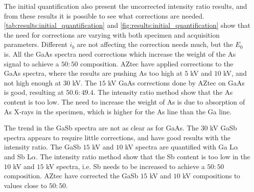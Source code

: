 




The initial quantification also present the uncorrected intensity ratio results, and from these results it is possible to see what corrections are needed.
\cref{tab:results:initial_quantification} and \cref{fig:results:initial_quantification} show that the need for corrections are varying with both specimen and acquisition parameters.
Different $i_b$ are not affecting the correction needs much, but the $E_0$ is.
All the GaAs spectra need corrections which increase the weight of the As signal to achieve a $50:50$ composition.
AZtec have applied corrections to the GaAs spectra, where the results are pushing As too high at $5$ kV and $10$ kV, and not high enough at $30$ kV.
The $15$ kV GaAs corrections done by AZtec on GaAs is good, resulting at $50.6:49.4$.
The intensity ratio method show that the As content is too low.
The need to increase the weight of As is due to absorption of As X-rays in the specimen, which is higher for the As line than the Ga line.


The trend in the GaSb spectra are not as clear as for GaAs.
The $30$ kV GaSb spectra appears to require little corrections, and have good results with the intensity ratio.
The GaSb $15$ kV and $10$ kV spectra are quantified with Ga L$\alpha$ and Sb L$\alpha$.
The intensity ratio method show that the Sb content is too low in the $10$ kV and $15$ kV spectra, i.e. Sb needs to be increased to achieve a $50:50$ composition.
AZtec have corrected the GaSb $15$ kV and $10$ kV compositions to values close to $50:50$.



